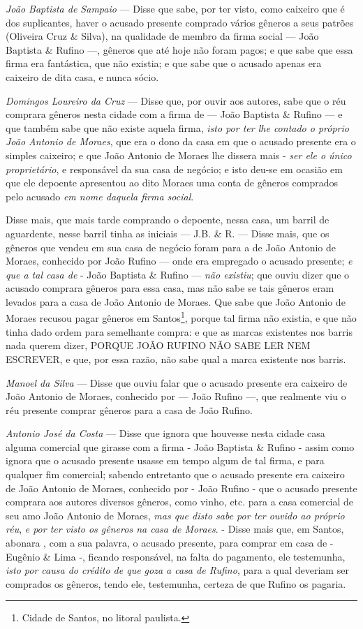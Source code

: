 \emph{João Baptista de Sampaio} --- Disse que sabe, por ter visto, como
caixeiro que é dos suplicantes, haver o acusado presente comprado vários
gêneros a seus patrões (Oliveira Cruz \& Silva), na qualidade de membro
da firma social --- João Baptista \& Rufino ---, gêneros que até hoje
não foram pagos; e que sabe que essa firma era fantástica, que não
existia; e que sabe que o acusado apenas era caixeiro de dita casa, e
nunca sócio.

\emph{Domingos Loureiro da Cruz} --- Disse que, por ouvir aos autores,
sabe que o réu comprara gêneros nesta cidade com a firma de --- João
Baptista \& Rufino --- e que também sabe que não existe aquela firma,
\emph{isto por ter lhe contado o próprio João Antonio de Moraes}, que
era o dono da casa em que o acusado presente era o simples caixeiro; e
que João Antonio de Moraes lhe dissera mais - \emph{ser ele o único
proprietário}, e responsável da sua casa de negócio; e isto deu-se em
ocasião em que ele depoente apresentou ao dito Moraes uma conta de
gêneros comprados pelo acusado \emph{em nome daquela firma social}.

Disse mais, que mais tarde comprando o depoente, nessa casa, um barril
de aguardente, nesse barril tinha as iniciais --- J.B. \& R. --- Disse
mais, que os gêneros que vendeu em sua casa de negócio foram para a de
João Antonio de Moraes, conhecido por João Rufino --- onde era
empregado o acusado presente; \emph{e que a tal casa de} - João Baptista
\& Rufino --- \emph{não existiu}; que ouviu dizer que o acusado
comprara gêneros para essa casa, mas não sabe se tais gêneros eram
levados para a casa de João Antonio de Moraes. Que sabe que João Antonio
de Moraes recusou pagar gêneros em Santos\footnote{Cidade de Santos,
  no litoral paulista.}, porque tal firma não existia, e que não tinha
dado ordem para semelhante compra: e que as marcas existentes nos barris
nada querem dizer, PORQUE JOÃO RUFINO NÃO SABE LER NEM ESCREVER, e que,
por essa razão, não sabe qual a marca existente nos barris.

\emph{Manoel da Silva} --- Disse que ouviu falar que o acusado presente
era caixeiro de João Antonio de Moraes, conhecido por --- João Rufino
---, que realmente viu o réu presente comprar gêneros para a casa de
João Rufino.

\emph{Antonio José da Costa} --- Disse que ignora que houvesse nesta
cidade casa alguma comercial que girasse com a firma - João Baptista \&
Rufino - assim como ignora que o acusado presente usasse em tempo algum
de tal firma, e para qualquer fim comercial; sabendo entretanto que o
acusado presente era caixeiro de João Antonio de Moraes, conhecido por -
João Rufino - que o acusado presente comprara aos autores diversos
gêneros, como vinho, etc. para a casa comercial de seu amo João Antonio
de Moraes, \emph{mas que disto sabe por ter ouvido ao próprio réu},
\emph{e por ter visto os gêneros na casa de Moraes}. - Disse mais que,
em Santos, abonara , com a sua palavra, o acusado presente, para comprar
em casa de - Eugênio \& Lima -, ficando responsável, na falta do
pagamento, ele testemunha, \emph{isto por causa do crédito de que goza a
casa de Rufino}, para a qual deveriam ser comprados os gêneros, tendo
ele, testemunha, certeza de que Rufino os pagaria.

